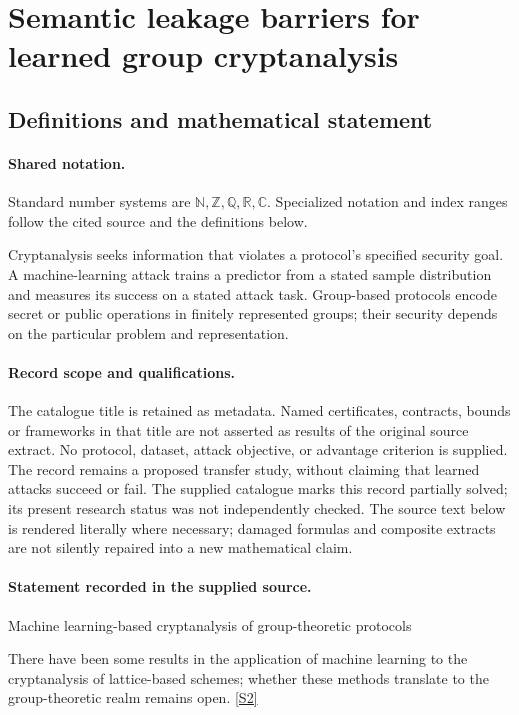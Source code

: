 \documentclass[11pt]{article}
\newcommand{\sref}[2]{\hyperlink{source:#1:#2}{[S#2]}}
\begin{document}
\section{Semantic leakage barriers for learned group cryptanalysis}\label{statement}

\subsection{Definitions and mathematical statement}

\paragraph{Shared notation.}Standard number systems are $\mathbb N,\mathbb Z,\mathbb Q,\mathbb R,\mathbb C$. Specialized notation and index ranges follow the cited source and the definitions below.


Cryptanalysis seeks information that violates a protocol's specified security goal. A machine-learning attack trains a predictor from a stated sample distribution and measures its success on a stated attack task. Group-based protocols encode secret or public operations in finitely represented groups; their security depends on the particular problem and representation.
\paragraph{Record scope and qualifications.}
The catalogue title is retained as metadata. Named certificates, contracts, bounds or frameworks in that title are not asserted as results of the original source extract.
No protocol, dataset, attack objective, or advantage criterion is supplied. The record remains a proposed transfer study, without claiming that learned attacks succeed or fail. The supplied catalogue marks this record partially solved; its present research status was not independently checked.
The source text below is rendered literally where necessary; damaged formulas and composite extracts are not silently repaired into a new mathematical claim.
\paragraph{Statement recorded in the supplied source.}
Machine learning-based cryptanalysis of group-theoretic protocols

There have been some results in the application of machine learning to the cryptanalysis of lattice-based schemes; whether these methods translate to the group-theoretic realm remains open. \sref{statement}{2}
\end{document}
